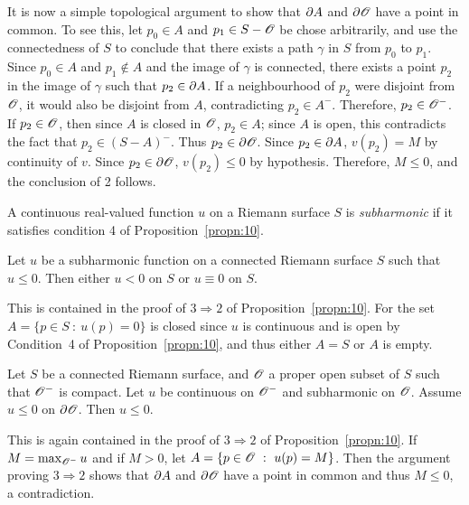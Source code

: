 \documentclass[a4paper,11pt]{article}
\begin{document}
\begin{mdframed}
\begin{itemize}
    It is now a simple topological argument to show that $\partial A$ and
    $\partial {\mathscr{O}}$ have a point in common.  To see this, let $p_0 \in A$ and
    $p_1 \in S - {\mathscr{O}}$ be chose arbitrarily, and use the connectedness
    of $S$ to conclude that there exists a path $\gamma$ in $S$ from
    $p_0$ to $p_1$.  Since $p_0 \in A$ and $p_1 \notin A$ and the
    image of $\gamma$ is connected, there exists a point $p_2$ in the
    image of $\gamma$ such that $p_2 \in \partial A$.  If a neighbourhood of
    $p_2$ were disjoint from ${\mathscr{O}}$, it would also be disjoint from
    $A$, contradicting $p_2 \in A^-$.  Therefore, $p_2 \in {\mathscr{O}}^-$.  If
    $p_2 \in {\mathscr{O}}$, then since $A$ is closed in ${\mathscr{O}}$, $p_2 \in A$;
    since $A$ is open, this contradicts the fact that $p_2 \in
    (S-A)^-$.  Thus $p_2 \in \partial {\mathscr{O}}$.  Since $p_2 \in \partial A$, $v(p_2) =
    M$ by continuity of $v$.  Since $p_2 \in \partial{\mathscr{O}}$, $v(p_2) \le 0$ by
    hypothesis.  Therefore, $M \le 0$, and the conclusion of 2
    follows.
  \end{itemize}
\end{mdframed}

\begin{defn}
  \label{def:4}
  A continuous real-valued function $u$ on a Riemann surface $S$ is
  \emph{subharmonic} if it satisfies condition 4 of
  Proposition~\ref{propn:10}.
\end{defn}

\begin{thm}
  Let $u$ be a subharmonic function on a connected Riemann surface $S$
  such that $u \le 0$.  Then either $u < 0$ on $S$ or $u \equiv 0$ on
  $S$.
\end{thm}

\begin{myproof}
  This is contained in the proof of $3 \Rightarrow 2$ of
  Proposition~\ref{propn:10}.  For the set $A = \{p \in S ~:~ u(p) =
  0\}$ is closed since $u$ is continuous and is open by Condition~4 of
  Proposition~\ref{propn:10}, and thus either $A = S$ or $A$ is
  empty.
\end{myproof}

\begin{thm}
  Let $S$ be a connected Riemann surface, and ${\mathscr{O}}$ a proper open
  subset of $S$ such that ${\mathscr{O}}^-$ is compact.  Let $u$ be continuous
  on ${\mathscr{O}}^-$ and subharmonic on ${\mathscr{O}}$.  Assume $u \le 0$ on $\partial
  {\mathscr{O}}$. Then $u \le 0$.
\end{thm}

\begin{myproof}
  This is again contained in the proof of $3 \Rightarrow 2$ of
  Proposition~\ref{propn:10}.  If $M = \max_{{\mathscr{O}}^-} u$ and if $M > 0$,
  let $A = \{p \in {\mathscr{O}} ~:~ u(p) = M\}$.  Then the argument proving $3
  \Rightarrow 2$ shows that $\partial A$ and $\partial {\mathscr{O}}$ have a point in common
  and thus $M \le 0$, a contradiction.
\end{myproof}
\end{document}

